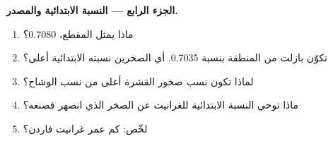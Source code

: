 \begin{problem}
\medskip
\noindent\textbf{الجزء الرابع --- النسبة الابتدائية والمصدر.}
\begin{enumerate}[resume]
  \item ماذا يمثل المقطع، 0.7080؟
  \item تكوّن بازلت من المنطقة بنسبة 0.7035. أي الصخرين
        نسبته الابتدائية أعلى؟
  \item لماذا تكون نسب صخور القشرة أعلى من نسب الوشاح؟
  \item ماذا توحي النسبة الابتدائية للغرانيت عن الصخر الذي
        انصهر فصنعه؟
  \item لخّص: كم عمر غرانيت فاردن؟
\end{enumerate}
\end{problem}
